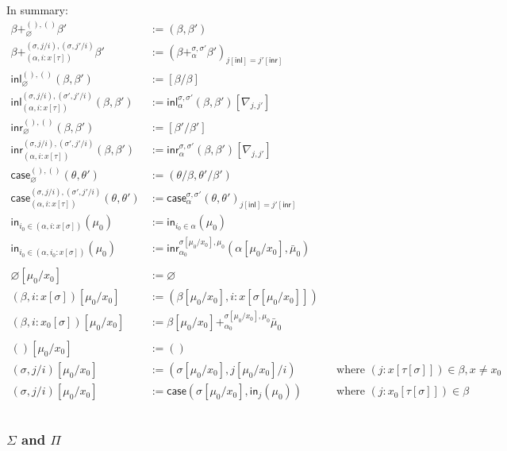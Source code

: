 \documentclass[10pt]{article}
\let\emptyset\varnothing
\newcommand\Pushout[5]{\ensuremath{#1 +^{#4,#5}_{#2} #3}}
\newcommand{\case}{\mathsf{case}}
\newcommand{\inl}{\mathsf{inl}}
\newcommand{\inr}{\mathsf{inr}}
\newcommand{\ini}{\mathsf{in}}
\begin{document}
In summary:
\begin{align*}
\Pushout{\beta}{\emptyset}{\beta'}{()}{()} &:= (\beta, \beta') \\
\Pushout{\beta}{(\alpha, i : x[\tau])}{\beta'}{(\sigma, j/i)}{(\sigma, j'/i)} &:= (\Pushout{\beta}{\alpha}{\beta'}{\sigma}{\sigma'})_{j[\inl] = j'[\inr]} \\
\inl^{(), ()}_\emptyset(\beta, \beta') &:= [\beta/\beta] \\
\inl^{(\sigma, j/i), (\sigma', j'/i)}_{(\alpha, i:x[\tau])} (\beta, \beta') &:= \inl^{\sigma, \sigma'}_\alpha (\beta, \beta') [\nabla_{j, j'}] \\
\inr^{(), ()}_\emptyset(\beta, \beta') &:= [\beta'/\beta'] \\
\inr^{(\sigma, j/i), (\sigma', j'/i)}_{(\alpha, i:x[\tau])} (\beta, \beta') &:= \inr^{\sigma, \sigma'}_\alpha (\beta, \beta') [\nabla_{j, j'}] \\
\case^{(),()}_\emptyset(\theta, \theta') &:= (\theta / \beta, \theta' / \beta') \\
\case^{(\sigma,j/i),(\sigma', j'/i)}_{(\alpha,i:x[\tau])}(\theta, \theta') &:= \case^{\sigma, \sigma'}_{\alpha}(\theta, \theta')_{j[\inl]=j'[\inr]} \\
\ini_{i_0 \in (\alpha, i : x[\sigma])}(\mu_0) &:= \ini_{i_0 \in \alpha}(\mu_0)\\
\ini_{i_0 \in (\alpha, i_0 : x[\sigma])}(\mu_0) &:= \inr^{\sigma[\mu_0/x_0],\mu_0}_{\alpha_0}(\alpha[\mu_0/x_0], \bar \mu_0) \\
\\
\emptyset[\mu_0/x_0] &:= \emptyset \\
(\beta, i : x[\sigma])[\mu_0/x_0] &:= (\beta[\mu_0/x_0], i : x[\sigma[\mu_0/x_0]]) \\
(\beta, i : x_0[\sigma])[\mu_0/x_0] &:= \Pushout{\beta[\mu_0/x_0]}{\alpha_0}{\bar \mu_0}{\sigma[\mu_0/x_0]}{\mu_0} \\
\\
()[\mu_0/x_0] &:= () \\
(\sigma, j/i)[\mu_0/x_0] &:= (\sigma[\mu_0/x_0], j[\mu_0/x_0]/i) && \text{where } (j : x[\tau[\sigma]]) \in \beta, x \neq x_0 \\
(\sigma, j/i)[\mu_0/x_0] &:= \case(\sigma[\mu_0/x_0], \ini_j(\mu_0)) && \text{where } (j : x_0[\tau[\sigma]]) \in \beta \\
\\
\end{align*}

\subsubsection{$\Sigma$ and $\Pi$}
\end{document}
